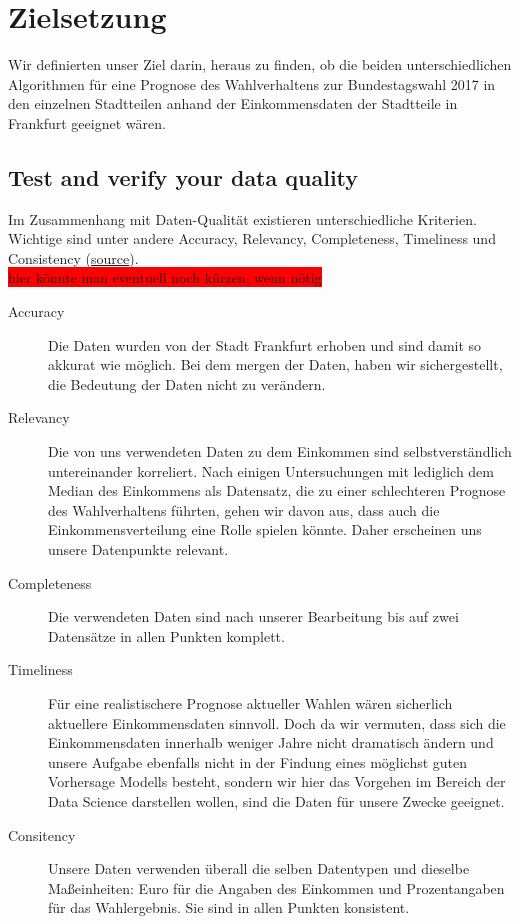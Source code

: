 \documentclass[a4paper,10pt]{scrartcl}
\begin{document}
\section{Zielsetzung}
Wir definierten unser Ziel darin, heraus zu finden, ob die beiden unterschiedlichen Algorithmen für eine Prognose des Wahlverhaltens zur Bundestagswahl 2017 in den einzelnen Stadtteilen anhand der Einkommensdaten der Stadtteile in Frankfurt geeignet wären. 

\subsection{Test and verify your data quality}
Im Zusammenhang mit Daten-Qualität existieren unterschiedliche Kriterien. Wichtige sind unter andere Accuracy, Relevancy, Completeness, Timeliness und Consistency (\href{https://towardsdatascience.com/7-steps-to-ensure-and-sustain-data-quality-3c0040591366}{source}). \\
\colorbox{red}{hier könnte man eventuell noch kürzen, wenn nötig}
\begin{description}
\item[Accuracy] Die Daten wurden von der Stadt Frankfurt erhoben und sind damit so akkurat wie möglich. Bei dem mergen der Daten, haben wir sichergestellt, die Bedeutung der Daten nicht zu verändern.
\item[Relevancy] Die von uns verwendeten Daten zu dem Einkommen sind selbstverständlich untereinander korreliert. Nach einigen Untersuchungen mit lediglich dem Median des Einkommens als Datensatz, die zu einer schlechteren Prognose des Wahlverhaltens führten, gehen wir davon aus, dass auch die Einkommensverteilung eine Rolle spielen könnte. Daher erscheinen uns unsere Datenpunkte relevant.
\item[Completeness] Die verwendeten Daten sind nach unserer Bearbeitung bis auf zwei Datensätze in allen Punkten komplett. 
\item[Timeliness] Für eine realistischere Prognose aktueller Wahlen wären sicherlich aktuellere Einkommensdaten sinnvoll. Doch da wir vermuten, dass sich die Einkommensdaten innerhalb weniger Jahre nicht dramatisch ändern und unsere Aufgabe ebenfalls nicht in der Findung eines möglichst guten Vorhersage Modells besteht, sondern wir hier das Vorgehen im Bereich der Data Science darstellen wollen, sind die Daten für unsere Zwecke geeignet.\\
\item[Consitency] Unsere Daten verwenden überall die selben Datentypen und dieselbe Maßeinheiten: Euro für die Angaben des Einkommen und Prozentangaben für das Wahlergebnis. Sie sind in allen Punkten konsistent.
\end{description}
\end{document}
